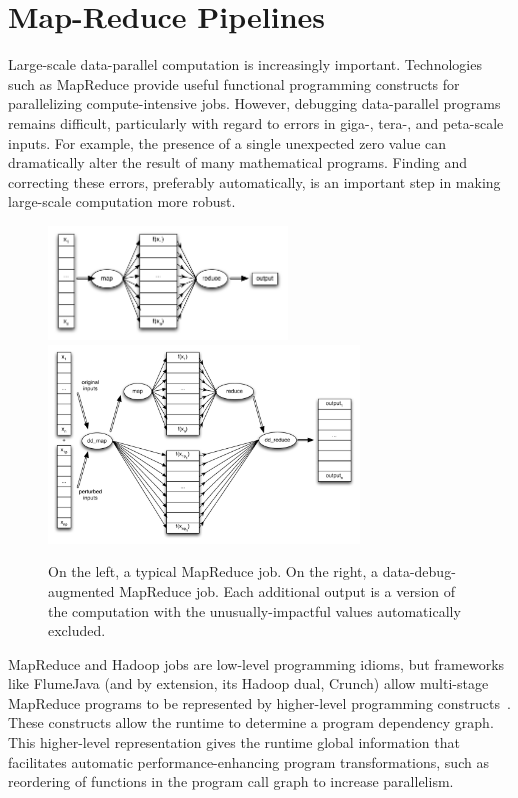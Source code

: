 \section{Map-Reduce Pipelines}
Large-scale data-parallel computation is increasingly important.  Technologies such as MapReduce provide useful functional programming constructs for parallelizing compute-intensive jobs.  However, debugging data-parallel programs remains difficult, particularly with regard to errors in giga-, tera-, and peta-scale inputs.  For example, the presence of a single unexpected zero value can dramatically alter the result of many mathematical programs.  Finding and correcting these errors, preferably automatically, is an important step in making large-scale computation more robust.

\begin{figure}[t]
	\includegraphics[width=2.5in]{images/mapreduce}
  \hfill
	\includegraphics[width=3.25in]{images/mapreduce_dd}
	\caption{
		On the left, a typical MapReduce job.  On the right, a data-debug-augmented MapReduce job.  Each additional output is a version of the computation with the unusually-impactful values automatically excluded.\label{fig:mapreduce_pipeline}
	}
\end{figure}

MapReduce and Hadoop jobs are low-level programming idioms, but frameworks like FlumeJava (and by extension, its Hadoop dual, Crunch) allow multi-stage MapReduce programs to be represented by higher-level programming constructs~\cite{pldi:flumejava}.  These constructs allow the runtime to determine a program dependency graph.  This higher-level representation gives the runtime global information that facilitates automatic performance-enhancing program transformations, such as reordering of functions in the program call graph to increase parallelism.

